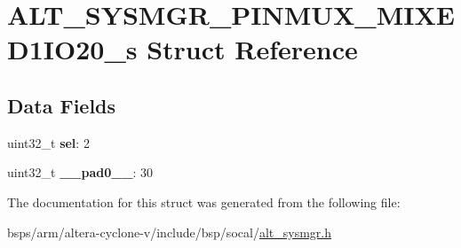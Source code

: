 \hypertarget{structALT__SYSMGR__PINMUX__MIXED1IO20__s}{}\section{A\+L\+T\+\_\+\+S\+Y\+S\+M\+G\+R\+\_\+\+P\+I\+N\+M\+U\+X\+\_\+\+M\+I\+X\+E\+D1\+I\+O20\+\_\+s Struct Reference}
\label{structALT__SYSMGR__PINMUX__MIXED1IO20__s}
\subsection*{Data Fields}
\begin{DoxyCompactItemize}
\item 
\mbox{\label{structALT__SYSMGR__PINMUX__MIXED1IO20__s_afb712855763e18895211cadb458d12b4}} 
uint32\+\_\+t {\bfseries sel}\+: 2
\item 
\mbox{\label{structALT__SYSMGR__PINMUX__MIXED1IO20__s_af045a1cd28feea9ae65a42a700f7bcdb}} 
uint32\+\_\+t {\bfseries \+\_\+\+\_\+pad0\+\_\+\+\_\+}\+: 30
\end{DoxyCompactItemize}


The documentation for this struct was generated from the following file\+:\begin{DoxyCompactItemize}
\item 
bsps/arm/altera-\/cyclone-\/v/include/bsp/socal/\mbox{\hyperlink{alt__sysmgr_8h}{alt\+\_\+sysmgr.\+h}}\end{DoxyCompactItemize}
